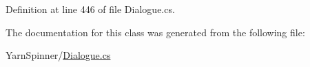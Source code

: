 Definition at line 446 of file Dialogue.\-cs.



The documentation for this class was generated from the following file\-:\begin{DoxyCompactItemize}
\item 
Yarn\-Spinner/\hyperlink{a00290}{Dialogue.\-cs}\end{DoxyCompactItemize}
